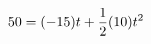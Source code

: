 \documentclass[preview]{standalone}
\begin{document}
\begin{align*}
\special{dvisvgm:raw <g id='unique000'>}50 = (-15)t + \frac{1}{2}(10)t^2\special{dvisvgm:raw </g>}
\end{align*}
\end{document}
